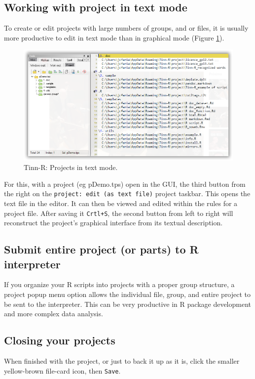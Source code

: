 \subsection{Working with project in text mode}
To create or edit projects with large numbers of groups, and or files, it is usually 
more productive to edit in text mode than in graphical mode
(Figure \ref{fig:tinn-r_projects_text_mode}).

\begin{figure}[H]
  \begin{center}
    \includegraphics[scale=0.60]{./res/projects_text_mode.png}
  \end{center}
  \caption{Tinn-R: Projects in text mode.}
  \label{fig:tinn-r_projects_text_mode}
\end{figure}

For this, with a project (eg pDemo.tps) open in the GUI, the third button from the right  
on the \texttt{project: edit (as text file)} project taskbar.  This opens the text file in the editor. 
It can then be viewed and edited within the rules for a project file.  
After saving it \texttt{Crtl+S}, the second button from left to right will reconstruct the project's 
graphical interface from its textual description.

\subsection{Submit entire project (or parts) to R interpreter}
If you organize your R scripts into projects with a proper group structure, a project popup menu option allows the individual file, 
group, and entire project to be sent to the interpreter. This can be very productive in R package development and more complex data analysis.

\subsection{Closing your projects}
When finished with the project, or just to back it up as it is, click the smaller yellow-brown file-card icon, then \texttt{Save}.
